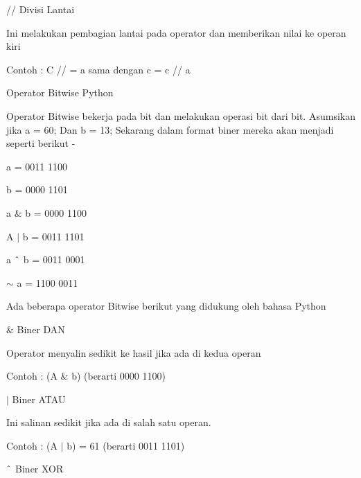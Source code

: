 \noindent
\vspace{12pt}
\noindent
// Divisi Lantai \par
\noindent
Ini melakukan pembagian lantai pada operator dan memberikan nilai ke operan kiri \par
\noindent
Contoh : C // = a sama dengan c = c // a \par
\noindent
\vspace{12pt}
\noindent
Operator Bitwise Python \par
\vspace{12pt}
\noindent
Operator Bitwise bekerja pada bit dan melakukan operasi bit dari bit. $  $Asumsikan jika a = 60; $  $Dan b = 13; $  $Sekarang dalam format biner mereka akan menjadi seperti berikut - \par
\vspace{12pt}
\noindent
a = 0011 1100 \par
\vspace{12pt}
\noindent
b = 0000 1101 \par
\vspace{12pt}
\vspace{12pt}
\noindent
a  $  \&  $ b = 0000 1100 \par
\vspace{12pt}
\noindent
A  $  \vert  $ b = 0011 1101 \par
\vspace{12pt}
\noindent
a  $  \string^  $ b = 0011 0001 \par
\vspace{12pt}
\noindent
 $  \sim  $ a = 1100 0011 \par
\vspace{12pt}
\noindent
Ada beberapa operator Bitwise berikut yang didukung oleh bahasa Python \par
\vspace{12pt}
\noindent
 $  \&  $ Biner DAN \par
\noindent
Operator menyalin sedikit ke hasil jika ada di kedua operan \par
\noindent
Contoh : (A  $  \&  $ b) (berarti 0000 1100) \par
\vspace{12pt}
\noindent
 $  \vert  $ $  $Biner ATAU \par
\noindent
Ini salinan sedikit jika ada di salah satu operan. \par
\noindent
Contoh : (A  $  \vert  $ b) = 61 (berarti 0011 1101) \par
\vspace{12pt}
\noindent
 $  \string^  $ Biner XOR \par
